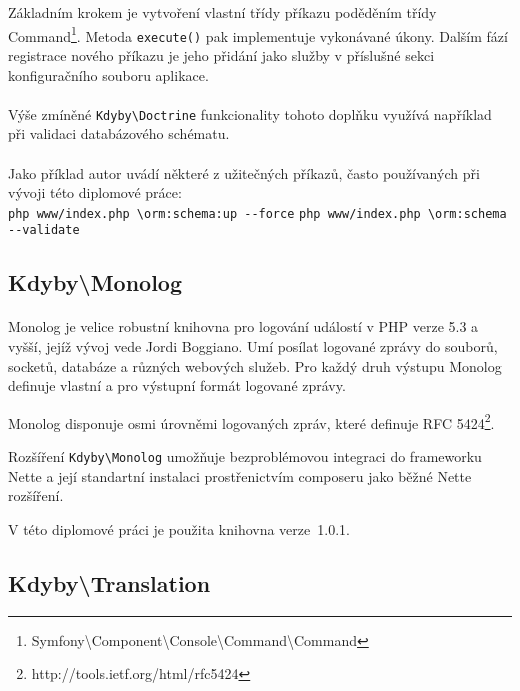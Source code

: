 \documentclass[11pt,oneside]{fithesis}
\begin{document}
        Základním krokem je vytvoření vlastní třídy příkazu poděděním třídy Command\footnote{Symfony\textbackslash Component\textbackslash Console\textbackslash Command\textbackslash Command}. Metoda \verb|execute()| pak implementuje vykonávané úkony. Dalším fází registrace nového příkazu je jeho přidání jako služby v příslušné sekci konfiguračního souboru aplikace. 
        \paragraph*{}
        Výše zmíněné \verb|Kdyby\Doctrine| funkcionality tohoto doplňku využívá například při validaci databázového schématu.

        \paragraph*{}
        Jako příklad autor uvádí některé z užitečných příkazů, často používaných při vývoji této diplomové práce:\\
        \verb|php www/index.php \orm:schema:up --force|
        \newline\verb|php www/index.php \orm:schema --validate|

        \subsection{Kdyby\textbackslash Monolog}
        \paragraph*{}
        Monolog je velice robustní knihovna pro logování událostí v PHP verze 5.3 a vyšší, jejíž vývoj vede Jordi Boggiano. Umí posílat logované zprávy do souborů, socketů, databáze a různých webových služeb. Pro každý druh výstupu Monolog definuje vlastní  a  pro výstupní formát logované zprávy. 

        Monolog disponuje osmi úrovněmi logovaných zpráv, které definuje RFC 5424\footnote{http://tools.ietf.org/html/rfc5424}.

        Rozšíření \verb|Kdyby\Monolog| umožňuje bezproblémovou integraci do frameworku Nette a její standartní instalaci prostřenictvím composeru jako běžné Nette rozšíření.

        V této diplomové práci je použita knihovna verze~1.0.1.

        \subsection{Kdyby\textbackslash Translation}
\end{document}
